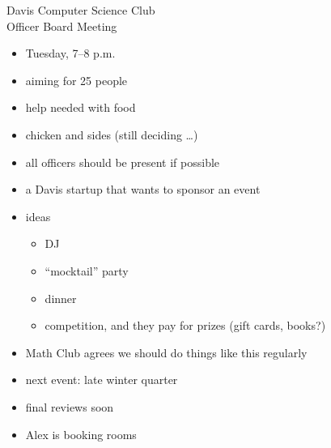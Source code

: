 \documentclass{article}
\begin{document}
\begin{Minutes}{Davis Computer Science Club\\Officer Board Meeting}




\maketitle
{}
\begin{itemize}
\item Tuesday, 7--8 p.m.
\item aiming for 25 people
\item help needed with food
\item chicken and sides (still deciding \dots)
\item all officers should be present if possible
\end{itemize}

\begin{itemize}
\item a Davis startup that wants to sponsor an event
\item ideas
  \begin{itemize}
  \item DJ
  \item ``mocktail'' party
  \item dinner
  \item competition, and they pay for prizes (gift cards, books?)
  \end{itemize}
\end{itemize}

\begin{itemize}
\item Math Club agrees we should do things like this regularly
\item next event: late winter quarter
\end{itemize}

\begin{itemize}
\item final reviews soon
\item Alex is booking rooms
\end{itemize}


\end{Minutes}
\end{document}

